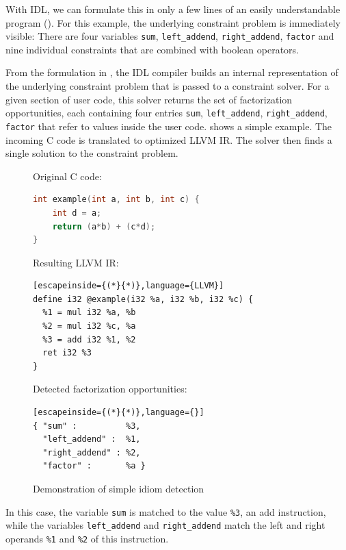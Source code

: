     With IDL, we can formulate this in only a few lines of an easily
    understandable program ().
    For this example, the underlying constraint problem is immediately visible:
    There are four variables \texttt{sum}, \texttt{left\_addend},
    \texttt{right\_addend}, \texttt{factor} and nine individual constraints
    that are combined with boolean operators.

    From the formulation in , the IDL compiler builds
    an internal representation of the underlying constraint problem that is
    passed to a constraint solver.
    For a given section of user code, this solver returns the set of
    factorization opportunities, each containing four entries
    \texttt{sum}, \texttt{left\_addend}, \texttt{right\_addend}, \texttt{factor}
    that refer to values inside the user code.
     shows a simple example.
    The incoming C code is translated to optimized LLVM IR.
    The solver then finds a single solution to the constraint problem.

\begin{figure}[ht]
Original C code:
\begin{lstlisting}[language={C++}]
int example(int a, int b, int c) {
    int d = a;
    return (a*b) + (c*d);
}
\end{lstlisting}
\vspace{1em}
Resulting LLVM IR:
\begin{lstlisting}[escapeinside={(*}{*)},language={LLVM}]
define i32 @example(i32 %a, i32 %b, i32 %c) {
  %1 = mul i32 %a, %b
  %2 = mul i32 %c, %a
  %3 = add i32 %1, %2
  ret i32 %3
}
\end{lstlisting}
\vspace{1em}
Detected factorization opportunities:
\begin{lstlisting}[escapeinside={(*}{*)},language={}]
{ "sum" :          %3,
  "left_addend" :  %1,
  "right_addend" : %2,
  "factor" :       %a }
\end{lstlisting}
\vspace{-0.3cm}
\caption{Demonstration of simple idiom detection}
\label{fig:firstexample}
\end{figure}

    In this case, the variable {\tt sum} is matched to the value {\tt \%3}, an
    add instruction, while the variables {\tt left\_addend} and
    {\tt right\_addend} match the left and right operands {\tt \%1} and
    {\tt \%2} of this instruction. 

